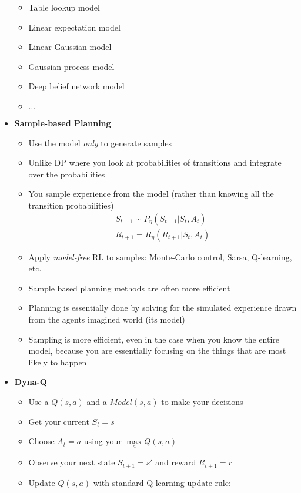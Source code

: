 \documentclass[12pt]{article}
\begin{document}
\begin{itemize}
    \begin{itemize}
      \item Table lookup model
      \item Linear expectation model
      \item Linear Gaussian model
      \item Gaussian process model
      \item Deep belief network model
      \item $\dots$
    \end{itemize}
    \item \textbf{Sample-based Planning}
    \begin{itemize}
      \item Use the model \textit{only} to generate samples
      \item Unlike DP where you look at probabilities of transitions
      and integrate over the probabilities
      \item You sample experience from the model (rather than knowing
      all the transition probabilities)
      \begin{gather*}
        S_{t+1} \sim P_\eta(S_{t+1} | S_t, A_t) \\
        R_{t+1} = R_\eta(R_{t+1} | S_t, A_t)
      \end{gather*}
      \item Apply \textit{model-free} RL to samples: Monte-Carlo control,
      Sarsa, Q-learning, etc.
      \item Sample based planning methods are often more efficient
      \item Planning is essentially done by solving for the simulated experience
      drawn from the agents imagined world (its model)
      \item Sampling is more efficient, even in the case when you know the entire model,
      because you are essentially focusing on the things that are most likely to happen
    \end{itemize}
    \item \textbf{Dyna-Q}
    \begin{itemize}
      \item Use a $Q(s,a)$ and a $Model(s,a)$ to make your decisions
      \item Get your current $S_t = s$
      \item Choose $A_t = a$ using your $\max\limits_aQ(s, a)$
      \item Observe your next state $S_{t+1} = s'$ and reward $R_{t+1} = r$
      \item Update $Q(s,a)$ with standard Q-learning update rule:

\end{itemize}
\end{itemize}
\end{document}
